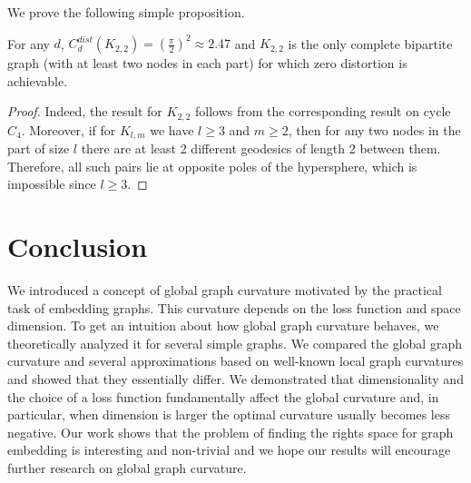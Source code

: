\documentclass[runningheads]{llncs}
\begin{document}
We prove the following simple proposition.

\begin{proposition}\label{prop:bipartite_distortion}
For any $d$, $C_d^{dist}(K_{2,2}) = \left(\frac{\pi}{2}\right)^2 \approx 2.47$ and $K_{2,2}$ is the only complete bipartite graph (with at least two nodes in each part) for which zero distortion is achievable.
\end{proposition}

\begin{proof}
Indeed, the result for $K_{2,2}$ follows from the corresponding result on cycle $C_4$. Moreover, if for $K_{l,m}$ we have $l \ge 3$ and $m \ge 2$, then for any two nodes in the part of size $l$ there are at least 2 different geodesics of length 2 between them. Therefore, all such pairs lie at opposite poles of the hypersphere, which is impossible since $l \ge 3$.
\end{proof}


\section{Conclusion}

We introduced a concept of global graph curvature motivated by the practical task of embedding graphs. This curvature depends on the loss function and space dimension. To get an intuition about how global graph curvature behaves, we theoretically analyzed it for several simple graphs. We compared the global graph curvature and several approximations based on well-known local graph curvatures and showed that they essentially differ. We demonstrated that dimensionality and the choice of a loss function fundamentally affect the global curvature and, in particular, when dimension is larger the optimal curvature usually becomes less negative. Our work shows that the problem of finding the rights space for graph embedding is interesting and non-trivial and we hope our results will encourage further research on global graph curvature.
\end{document}
